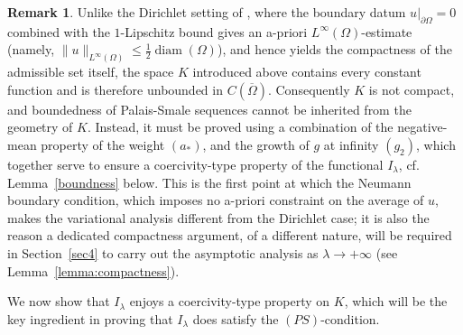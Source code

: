 \documentclass[11pt,reqno]{amsart}
\theoremstyle{plain}
\theoremstyle{definition}
\newtheorem{remark}[theorem]{Remark}
\numberwithin{equation}{section}
\begin{document}
\begin{remark}\label{rmk:K-noncompact}
Unlike the Dirichlet setting of \cite{BeJeMa14}, where the boundary datum $u|_{\partial \Omega} = 0$ combined with the $1$-Lipschitz bound gives an a-priori
$L^{\infty}(\Omega)$-estimate (namely, $\|u\|_{L^{\infty}(\Omega)} \leq \tfrac 12 \operatorname{diam}(\Omega)$), and hence yields the compactness of the admissible set
itself, the space $K$ introduced above contains every constant function and
is therefore unbounded in $C(\overline{\Omega})$. Consequently $K$ is
not compact, and boundedness of Palais-Smale sequences cannot be inherited from the geometry of
$K$. Instead, it must be proved using a combination of the negative-mean property of the weight  $(a_\ast)$, and the growth of $g$ at infinity $(g_2)$, which together serve to ensure a coercivity-type property of the functional $I_\lambda$, cf. Lemma~\ref{boundness} below. This is the first point at which the Neumann boundary condition, which
imposes no a-priori constraint on the average of $u$, makes the
variational analysis different from the Dirichlet case; it is
also the reason a dedicated compactness argument, of a different nature,
will be required in Section~\ref{sec4} to carry out the asymptotic analysis
as $\lambda \to +\infty$ (see
Lemma~\ref{lemma:compactness}).
\end{remark}

We now show that $I_\lambda$ enjoys a coercivity-type property on $K$, which will be the key ingredient in proving that $I_\lambda$ does satisfy the $(PS)$-condition.
\end{document}
